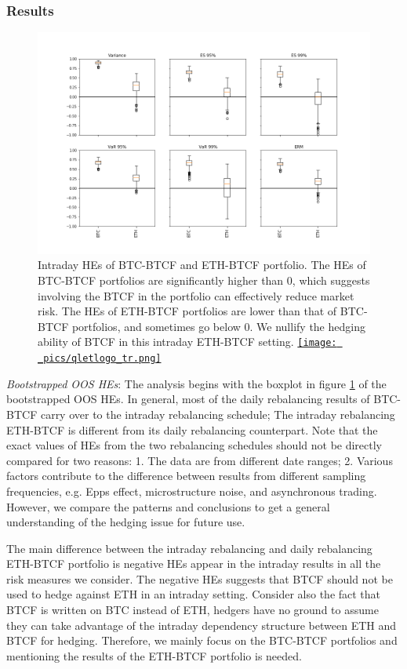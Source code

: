 \documentclass[11pt,a4paper,english]{article}
\begin{document}
\subsubsection{Results}
\begin{figure}[t]
\includegraphics[width=\textwidth]{_pics/hourly_HE.png}
  \caption{Intraday HEs of BTC-BTCF and ETH-BTCF portfolio. The HEs of BTC-BTCF portfolios are significantly higher than $0$,
which suggests involving the BTCF in the portfolio can effectively reduce market risk.
The HEs of ETH-BTCF portfolios are lower than that of BTC-BTCF portfolios, and sometimes go below $0$.
We nullify the hedging ability of BTCF in this intraday ETH-BTCF setting.
  \href{http://www.quantlet.com/}{\texttt{[image: \_pics/qletlogo\_tr.png]}} }
\label{fig:HEboxplot_intraday}
\end{figure}

\textit{Bootstrapped OOS HEs}: The analysis begins with the boxplot in figure \ref{fig:HEboxplot_intraday} of the bootstrapped OOS HEs.
In general, most of the daily rebalancing results of BTC-BTCF carry over to the intraday rebalancing schedule;
The intraday rebalancing ETH-BTCF is different from its daily rebalancing counterpart.
Note that the exact values of HEs from the two rebalancing schedules should not be directly compared for two reasons: 1. The data are from different date ranges; 2. Various factors contribute to the difference between results from different sampling frequencies, e.g. Epps effect, microstructure noise,
and asynchronous trading.
However, we compare the patterns and conclusions to get a general understanding of the hedging issue for future use.

The main difference between the intraday rebalancing and daily rebalancing ETH-BTCF portfolio is negative HEs appear in the intraday results in all the risk measures we consider.
The negative HEs suggests that BTCF should not be used to hedge against ETH in an intraday setting.
Consider also the fact that BTCF is written on BTC instead of ETH, hedgers have no ground to assume they can take advantage of the intraday dependency structure between ETH and BTCF for hedging.
Therefore, we mainly focus on the BTC-BTCF portfolios and mentioning the results of the ETH-BTCF portfolio is needed.
\end{document}
